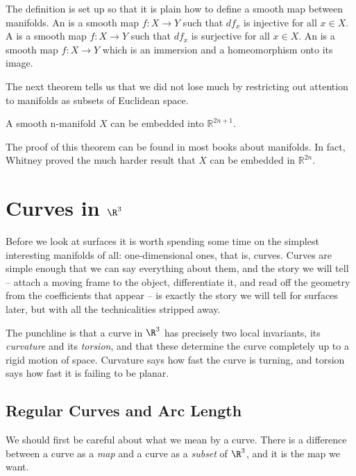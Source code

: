 The definition is set up so that it is plain how to define a smooth map between manifolds. An  is a smooth map $f: X \rightarrow Y$ such that $d f_{x}$ is injective for all $x \in X$. A  is a smooth map $f: X \rightarrow Y$ such that $d f_{x}$ is surjective for all $x \in X$. An  is a smooth map $f: X \rightarrow Y$ which is an immersion and a homeomorphism onto its image.

The next theorem tells us that we did not lose much by restricting out attention to manifolds as subsets of Euclidean space.

\begin{theorem}
    A smooth n-manifold $X$ can be embedded into $\mathbb{R}^{2 n+1}$.
\end{theorem}

The proof of this theorem can be found in most books about manifolds. In fact, Whitney proved the much harder result that $X$ can be embedded in $\mathbb{R}^{2 n}$.
\section{Curves in \texorpdfstring{$\R^3$}{R3}}

Before we look at surfaces it is worth spending some time on the simplest interesting manifolds of all: one-dimensional ones, that is, curves. Curves are simple enough that we can say everything about them, and the story we will tell -- attach a moving frame to the object, differentiate it, and read off the geometry from the coefficients that appear -- is exactly the story we will tell for surfaces later, but with all the technicalities stripped away.

The punchline is that a curve in $\R^3$ has precisely two local invariants, its \emph{curvature} and its \emph{torsion}, and that these determine the curve completely up to a rigid motion of space. Curvature says how fast the curve is turning, and torsion says how fast it is failing to be planar.

\subsection{Regular Curves and Arc Length}

We should first be careful about what we mean by a curve. There is a difference between a curve as a \emph{map} and a curve as a \emph{subset} of $\R^3$, and it is the map we want.

